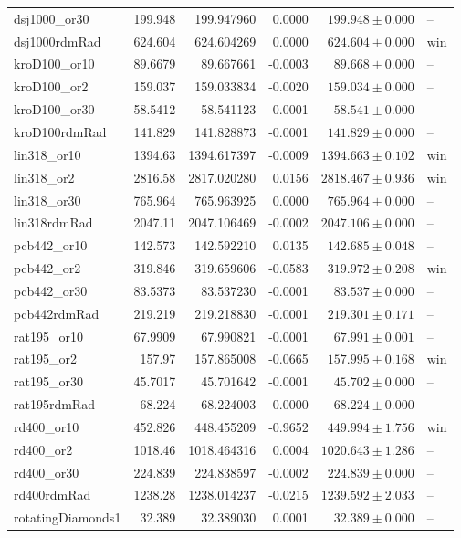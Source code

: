 \documentclass[11pt]{article}
\begin{document}
\begin{longtable}{lrrrrl}
dsj1000\_or30 & 199.948 & 199.947960 & 0.0000 & $199.948 \pm 0.000$ & -- \\
dsj1000rdmRad & 624.604 & 624.604269 & 0.0000 & $624.604 \pm 0.000$ & win \\
kroD100\_or10 & 89.6679 & 89.667661 & -0.0003 & $89.668 \pm 0.000$ & -- \\
kroD100\_or2 & 159.037 & 159.033834 & -0.0020 & $159.034 \pm 0.000$ & -- \\
kroD100\_or30 & 58.5412 & 58.541123 & -0.0001 & $58.541 \pm 0.000$ & -- \\
kroD100rdmRad & 141.829 & 141.828873 & -0.0001 & $141.829 \pm 0.000$ & -- \\
lin318\_or10 & 1394.63 & 1394.617397 & -0.0009 & $1394.663 \pm 0.102$ & win \\
lin318\_or2 & 2816.58 & 2817.020280 & 0.0156 & $2818.467 \pm 0.936$ & win \\
lin318\_or30 & 765.964 & 765.963925 & 0.0000 & $765.964 \pm 0.000$ & -- \\
lin318rdmRad & 2047.11 & 2047.106469 & -0.0002 & $2047.106 \pm 0.000$ & -- \\
pcb442\_or10 & 142.573 & 142.592210 & 0.0135 & $142.685 \pm 0.048$ & -- \\
pcb442\_or2 & 319.846 & 319.659606 & -0.0583 & $319.972 \pm 0.208$ & win \\
pcb442\_or30 & 83.5373 & 83.537230 & -0.0001 & $83.537 \pm 0.000$ & -- \\
pcb442rdmRad & 219.219 & 219.218830 & -0.0001 & $219.301 \pm 0.171$ & -- \\
rat195\_or10 & 67.9909 & 67.990821 & -0.0001 & $67.991 \pm 0.001$ & -- \\
rat195\_or2 & 157.97 & 157.865008 & -0.0665 & $157.995 \pm 0.168$ & win \\
rat195\_or30 & 45.7017 & 45.701642 & -0.0001 & $45.702 \pm 0.000$ & -- \\
rat195rdmRad & 68.224 & 68.224003 & 0.0000 & $68.224 \pm 0.000$ & -- \\
rd400\_or10 & 452.826 & 448.455209 & -0.9652 & $449.994 \pm 1.756$ & win \\
rd400\_or2 & 1018.46 & 1018.464316 & 0.0004 & $1020.643 \pm 1.286$ & -- \\
rd400\_or30 & 224.839 & 224.838597 & -0.0002 & $224.839 \pm 0.000$ & -- \\
rd400rdmRad & 1238.28 & 1238.014237 & -0.0215 & $1239.592 \pm 2.033$ & -- \\
rotatingDiamonds1 & 32.389 & 32.389030 & 0.0001 & $32.389 \pm 0.000$ & -- \\

\end{longtable}
\end{document}
